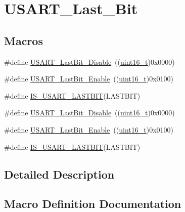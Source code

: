 \hypertarget{group___u_s_a_r_t___last___bit}{}\section{U\+S\+A\+R\+T\+\_\+\+Last\+\_\+\+Bit}
\label{group___u_s_a_r_t___last___bit}
\subsection*{Macros}
\begin{DoxyCompactItemize}
\item 
\#define \hyperlink{group___u_s_a_r_t___last___bit_ga129c89b9e0dbb3ce43ee92589b3324e5}{U\+S\+A\+R\+T\+\_\+\+Last\+Bit\+\_\+\+Disable}~((\hyperlink{_p_e___types_8h_a1f1825b69244eb3ad2c7165ddc99c956}{uint16\+\_\+t})0x0000)
\item 
\#define \hyperlink{group___u_s_a_r_t___last___bit_gaf8c19d1ce01c6efff8c24ee82cc7b52e}{U\+S\+A\+R\+T\+\_\+\+Last\+Bit\+\_\+\+Enable}~((\hyperlink{_p_e___types_8h_a1f1825b69244eb3ad2c7165ddc99c956}{uint16\+\_\+t})0x0100)
\item 
\#define \hyperlink{group___u_s_a_r_t___last___bit_gaa941695e5612b53e9c2aca6a9fa0d695}{I\+S\+\_\+\+U\+S\+A\+R\+T\+\_\+\+L\+A\+S\+T\+B\+IT}(L\+A\+S\+T\+B\+IT)
\item 
\#define \hyperlink{group___u_s_a_r_t___last___bit_ga129c89b9e0dbb3ce43ee92589b3324e5}{U\+S\+A\+R\+T\+\_\+\+Last\+Bit\+\_\+\+Disable}~((\hyperlink{_p_e___types_8h_a1f1825b69244eb3ad2c7165ddc99c956}{uint16\+\_\+t})0x0000)
\item 
\#define \hyperlink{group___u_s_a_r_t___last___bit_gaf8c19d1ce01c6efff8c24ee82cc7b52e}{U\+S\+A\+R\+T\+\_\+\+Last\+Bit\+\_\+\+Enable}~((\hyperlink{_p_e___types_8h_a1f1825b69244eb3ad2c7165ddc99c956}{uint16\+\_\+t})0x0100)
\item 
\#define \hyperlink{group___u_s_a_r_t___last___bit_gaa941695e5612b53e9c2aca6a9fa0d695}{I\+S\+\_\+\+U\+S\+A\+R\+T\+\_\+\+L\+A\+S\+T\+B\+IT}(L\+A\+S\+T\+B\+IT)
\end{DoxyCompactItemize}


\subsection{Detailed Description}


\subsection{Macro Definition Documentation}
